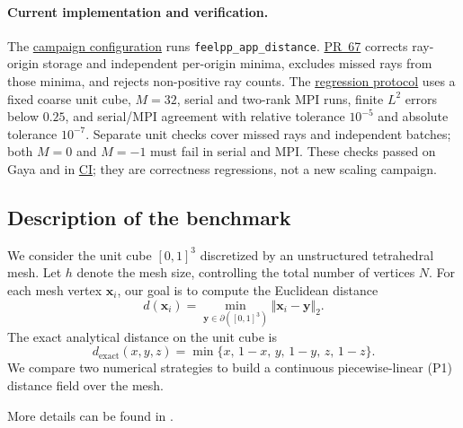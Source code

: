 \paragraph{Current implementation and verification.}
The \href{https://github.com/numpex/apps-feelpp/blob/main/src/app-feelpp-distance/feelpp-distance.json}{campaign configuration}
runs \nolinkurl{feelpp_app_distance}.
\href{https://github.com/numpex/apps-feelpp/pull/67}{PR~67}
corrects ray-origin storage and independent per-origin minima, excludes missed
rays from those minima, and rejects non-positive ray counts. The
\href{https://github.com/numpex/apps-feelpp/blob/main/tests/check_distance_bvh.py}{regression protocol}
uses a fixed coarse unit cube, $M=32$, serial and two-rank MPI runs, finite
$L^2$ errors below $0.25$, and serial/MPI agreement with relative tolerance
$10^{-5}$ and absolute tolerance $10^{-7}$. Separate unit checks cover missed
rays and independent batches; both $M=0$ and $M=-1$ must fail in serial and MPI.
These checks passed on Gaya and in
\href{https://github.com/numpex/apps-feelpp/actions/runs/39012765273}{CI}; they are correctness regressions, not a new scaling campaign.




\subsection{Description of the benchmark}

We consider the unit cube $[0,1]^3$ discretized by an unstructured tetrahedral mesh.
Let $h$ denote the mesh size, controlling the total number of vertices $N$.
For each mesh vertex $\mathbf{x}_i$, our goal is to compute the Euclidean distance
\begin{equation}\label{eq:distance-definition}
  d(\mathbf{x}_i) = \min_{\mathbf{y}\in\partial([0,1]^3)} \Vert\mathbf{x}_i - \mathbf{y}\Vert_2.
\end{equation}
The exact analytical distance on the unit cube is
\begin{equation}\label{eq:distance-exact}
  d_{\mathrm{exact}}(x,y,z) = \min\{x,\,1-x,\,y,\,1-y,\,z,\,1-z\}.
\end{equation}
We compare two numerical strategies to build a continuous piecewise-linear (P1) distance field over the mesh.

More details can be found in \cite{van_landeghem_micro-swimming_2025}.


